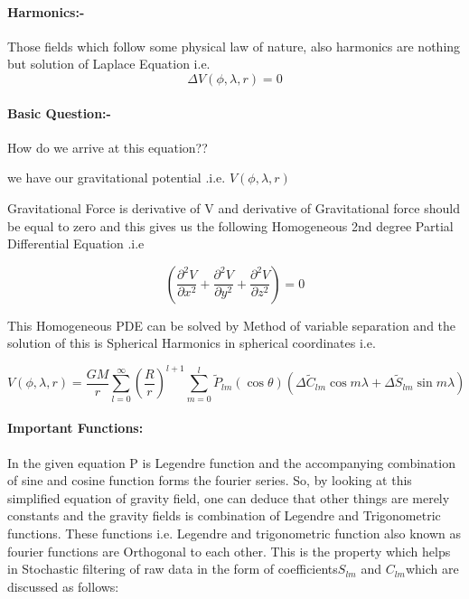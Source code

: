 \documentclass[a4paper,12pt]{article}
\begin{document}
\paragraph{Harmonics:-} 
 Those fields which follow some physical law of nature, also harmonics are nothing but solution of Laplace Equation i.e.
\begin {equation}
      \Delta  V(\phi,\lambda,r)=0
\end{equation}

\paragraph{Basic Question:-} How do we arrive at this equation??

we have our gravitational potential .i.e. $V(\phi,\lambda,r)$

Gravitational Force is derivative of V and derivative of Gravitational force should be equal to zero and this gives us the following Homogeneous 2nd degree Partial Differential Equation .i.e

   \[ \left( \frac{\partial^2 V}{\partial x^2}
      + \frac{\partial^2 V}{\partial y^2}
      + \frac{\partial^2 V}{\partial z^2} \right)=0 \]

This Homogeneous PDE  can be solved by Method of variable separation and the solution of this is Spherical Harmonics in spherical coordinates i.e.

\begin{equation}
V(\phi,\lambda,r)=\frac{GM}{r}\sum_{l=0}^{\infty} \left(\frac{R}{r}\right)^{l+1}\sum_{m=0}^{l} \widetilde{P}_{lm}(\cos\theta)(\Delta\widetilde{C}_{lm}\cos m\lambda + \Delta\widetilde{S}_{lm}\sin m\lambda)
\end{equation}

\paragraph{Important Functions:} 
In the given equation P is Legendre function and the accompanying combination of sine and cosine function forms the fourier series. So, by looking at this simplified equation of gravity field, one can deduce that other things are merely constants and the gravity fields is combination of Legendre and Trigonometric functions.
These functions i.e. Legendre and trigonometric function also known as fourier functions are Orthogonal to each other. This is the property which helps in Stochastic filtering of raw data in the form of coefficients$ S_{lm}$ and $C_{lm} $which are discussed as follows:  
\end{document}
